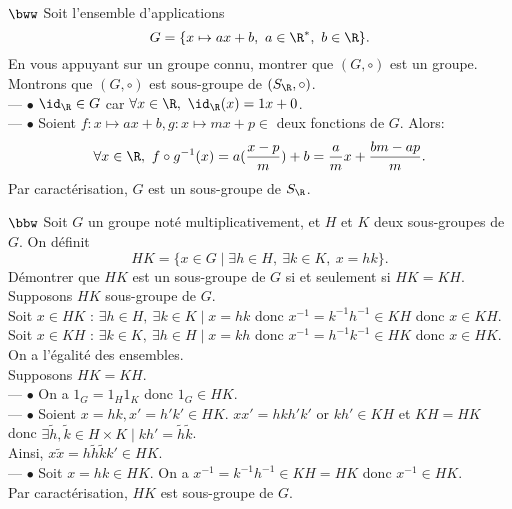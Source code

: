 \documentclass[11pt]{article}
\begin{document}
\begin{exercice}{$\bww$}{}
    Soit l'ensemble d'applications
    \begin{equation*}
        G=\{x\mapsto ax + b, ~ a\in\R^*, ~ b\in\R\}.
    \end{equation*}
    En vous appuyant sur un groupe connu, montrer que $(G,\circ)$ est un groupe.
    \tcblower
    Montrons que $(G,\circ)$ est sous-groupe de $(S_\R,\circ)$.\\
    --- $\bullet$ $\id_\R\in G$ car $\forall x\in\R, ~ \id_\R(x)=1x+0$.\\
    --- $\bullet$ Soient $f:x\mapsto ax+b,g:x\mapsto mx+p\in$ deux fonctions de $G$. Alors:
    \begin{equation*}
        \forall x \in \R, ~ f\circ g^{-1}(x)=a(\frac{x-p}{m})+b=\frac{a}{m}x+\frac{bm-ap}{m}.
    \end{equation*}
    Par caractérisation, $G$ est un sous-groupe de $S_\R$.
\end{exercice}

\begin{exercice}{$\bbw$}{}
    Soit $G$ un groupe noté multiplicativement, et $H$ et $K$ deux sous-groupes de $G$. On définit
    \begin{equation*}
        HK=\{x\in G\mid \exists h\in H, ~ \exists k \in K, ~ x = hk\}.
    \end{equation*}
    Démontrer que $HK$ est un sous-groupe de $G$ si et seulement si $HK=KH$.
    \tcblower
    \boxed{\ra} Supposons $HK$ sous-groupe de $G$.\\
    \boxed{\subset} Soit $x\in HK$ : $\exists h\in H, ~ \exists k\in K \mid x=hk$ donc $x^{-1}=k^{-1}h^{-1}\in KH$ donc $x\in KH$.\\
    \boxed{\supset} Soit $x\in KH$ : $\exists k\in K, ~ \exists h\in H \mid x=kh$ donc $x^{-1}=h^{-1}k^{-1}\in HK$ donc $x\in HK$.\\
    On a l'égalité des ensembles.\\
    \boxed{\la} Supposons $HK=KH$.\\
    --- $\bullet$ On a $1_G=1_H1_K$ donc $1_G\in HK$.\\
    --- $\bullet$ Soient $x=hk,x'=h'k'\in HK$. $xx'=hkh'k'$ or $kh'\in KH$ et $KH=HK$ donc $\exists \tilde{h},\tilde{k}\in H\times K\mid kh'=\tilde{h}\tilde{k}$.\\
    Ainsi, $x\tilde{x}=h\tilde{h}\tilde{k}k'\in HK$.\\
    --- $\bullet$ Soit $x=hk\in HK$. On a $x^{-1}=k^{-1}h^{-1}\in KH = HK$ donc $x^{-1}\in HK$.\\
    Par caractérisation, $HK$ est sous-groupe de $G$.
\end{exercice}
\end{document}
